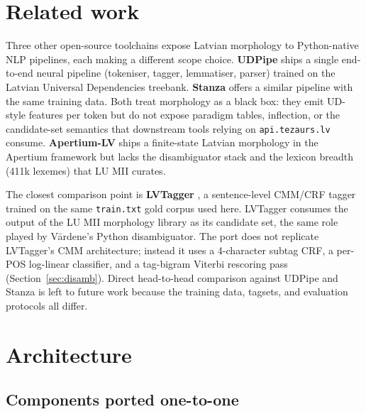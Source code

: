 \documentclass[11pt,a4paper]{article}
\begin{document}
\section{Related work}

Three other open-source toolchains expose Latvian morphology to
Python-native NLP pipelines, each making a different scope choice.
\textbf{UDPipe} \cite{straka2017udpipe} ships a single end-to-end
neural pipeline (tokeniser, tagger, lemmatiser, parser) trained on the
Latvian Universal Dependencies treebank. \textbf{Stanza}
\cite{qi2020stanza} offers a similar pipeline with the same training
data. Both treat morphology as a black box: they emit UD-style
features per token but do not expose paradigm tables, inflection, or
the candidate-set semantics that downstream tools relying on
\texttt{api.tezaurs.lv} consume. \textbf{Apertium-LV}
\cite{apertium} ships a finite-state Latvian morphology in the
Apertium framework but lacks the disambiguator stack and the lexicon
breadth (411k lexemes) that LU MII curates.

{\sloppy
The closest comparison point is \textbf{LVTagger}
\cite{paikens2013}, a sentence-level CMM/CRF tagger trained on the
same \texttt{train.txt} gold corpus used here. LVTagger consumes the
output of the LU MII morphology library as its candidate set, the
same role played by Vārdene's Python disambiguator. The port does
not replicate LVTagger's CMM architecture; instead it uses a
4-character subtag CRF, a per-POS log-linear classifier, and a
tag-bigram Viterbi rescoring pass (Section~\ref{sec:disamb}). Direct
head-to-head comparison against UDPipe and Stanza is left to future
work because the training data, tagsets, and evaluation protocols
all differ.\par}

\section{Architecture}

\subsection{Components ported one-to-one}
\end{document}

